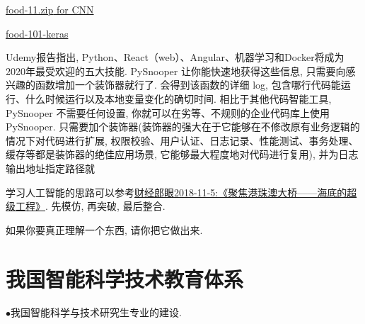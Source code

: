 \href{https://drive.google.com/uc?id=19CzXudqN58R3D-1G8KeFWk8UDQwlb8is}{\href{https://drive.google.com/drive/my-drive}{food-11.zip} for CNN}

\href{https://github.com/zggl/food-101-keras}{food-101-keras}

Udemy报告指出, Python、React（web）、Angular、机器学习和Docker将成为2020年最受欢迎的五大技能.
PySnooper 让你能快速地获得这些信息, 只需要向感兴趣的函数增加一个装饰器就行了.
会得到该函数的详细 log, 包含哪行代码能运行、什么时候运行以及本地变量变化的确切时间.
相比于其他代码智能工具, PySnooper 不需要任何设置, 你就可以在劣等、不规则的企业代码库上使用 PySnooper.
只需要加个装饰器(装饰器的强大在于它能够在不修改原有业务逻辑的情况下对代码进行扩展, 权限校验、用户认证、日志记录、性能测试、事务处理、缓存等都是装饰器的绝佳应用场景, 它能够最大程度地对代码进行复用), 并为日志输出地址指定路径就
\begin{tcolorbox}[colback=yellow!5!white,colframe=yellow!50!black, colbacktitle=yellow!75!black]
学习人工智能的思路可以参考\href{https://www.iqiyi.com/v_19rr3csqmo.html}{财经郎眼2018-11-5:《聚焦港珠澳大桥——海底的超级工程》}. 先模仿, 再突破, 最后整合.
\begin{tcolorbox}[colback=white!50,colframe=orange!50,title=费曼]
\begin{center}
 如果你要真正理解一个东西, 请你把它做出来.
\end{center}
\end{tcolorbox}
\end{tcolorbox}
%
%
%
\section{我国智能科学技术教育体系}
$\bullet$我国智能科学与技术研究生专业的建设.

